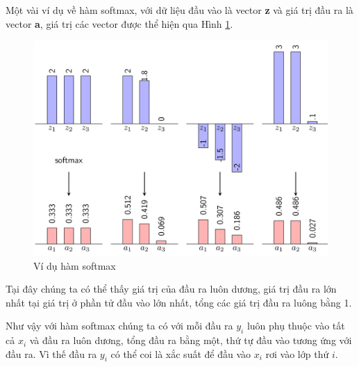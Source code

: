 Một vài ví dụ về hàm softmax, với dữ liệu đầu vào là vector \textbf{z} và giá trị đầu ra là vector \textbf{a}, giá trị các vector được thể hiện qua Hình \ref{fig:vdsoftmax}.
\begin{center}
	\begin{figure}[htp]
	\begin{center}
		\includegraphics[scale=0.1]{chap3/image/softmax_ex.png}
	\end{center}			
	\caption{Ví dụ hàm softmax}
	\label{fig:vdsoftmax}
	\end{figure}
\end{center}
Tại đây chúng ta có thể thấy giá trị của đầu ra luôn dương, giá trị đầu ra lớn nhất tại giá trị ở phần tử đầu vào lớn nhất, tổng các giá trị đầu ra luông bằng 1. \par

Như vậy với hàm softmax chúng ta có với mỗi đầu ra \textit{$y_i$} luôn phụ thuộc vào tất cả \textit{$x_i$} và đầu ra luôn dương, tổng đầu ra bằng một, thứ tự đầu vào tương ứng với đầu ra. Vì thế  đầu ra $y_i$ có thể coi là xắc suất để đầu vào $x_i$ rơi vào lớp thứ $i$.

